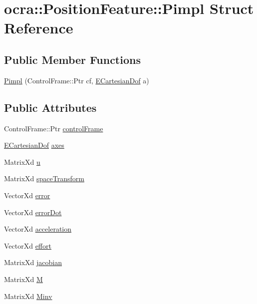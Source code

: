 \hypertarget{structocra_1_1PositionFeature_1_1Pimpl}{}\section{ocra\+:\+:Position\+Feature\+:\+:Pimpl Struct Reference}
\label{structocra_1_1PositionFeature_1_1Pimpl}
\subsection*{Public Member Functions}
\begin{DoxyCompactItemize}
\item 
\hyperlink{structocra_1_1PositionFeature_1_1Pimpl_ad886f374a5f070290519a8ccbaff9ab8}{Pimpl} (Control\+Frame\+::\+Ptr cf, \hyperlink{namespaceocra_a436781c7059a0f76027df1c652126260}{E\+Cartesian\+Dof} a)
\end{DoxyCompactItemize}
\subsection*{Public Attributes}
\begin{DoxyCompactItemize}
\item 
Control\+Frame\+::\+Ptr \hyperlink{structocra_1_1PositionFeature_1_1Pimpl_ad770aac1608c2e6ccf13ee84539313c5}{control\+Frame}
\item 
\hyperlink{namespaceocra_a436781c7059a0f76027df1c652126260}{E\+Cartesian\+Dof} \hyperlink{structocra_1_1PositionFeature_1_1Pimpl_a671e502b35c4d7ec8c8f972933ebac1e}{axes}
\item 
Matrix\+Xd \hyperlink{structocra_1_1PositionFeature_1_1Pimpl_a5299db1f5f86c7a5808fbf1738ee438a}{u}
\item 
Matrix\+Xd \hyperlink{structocra_1_1PositionFeature_1_1Pimpl_a2e80e58cc94be8c44f8fee3dd030192e}{space\+Transform}
\item 
Vector\+Xd \hyperlink{structocra_1_1PositionFeature_1_1Pimpl_ab0c14028446505c11d15d0dfce51b97a}{error}
\item 
Vector\+Xd \hyperlink{structocra_1_1PositionFeature_1_1Pimpl_a3bff7b8d61a5575a68503d6767478950}{error\+Dot}
\item 
Vector\+Xd \hyperlink{structocra_1_1PositionFeature_1_1Pimpl_a2a251a27da0e093461ba88a7dcb5ce1d}{acceleration}
\item 
Vector\+Xd \hyperlink{structocra_1_1PositionFeature_1_1Pimpl_a66425331a37215913daa3ca7de5bce57}{effort}
\item 
Matrix\+Xd \hyperlink{structocra_1_1PositionFeature_1_1Pimpl_a9cd18a0039e2ebbce05d78403667dd02}{jacobian}
\item 
Matrix\+Xd \hyperlink{structocra_1_1PositionFeature_1_1Pimpl_aa061dcd02d8f11de5edd55e8f2535bfe}{M}
\item 
Matrix\+Xd \hyperlink{structocra_1_1PositionFeature_1_1Pimpl_a7f6b8df16f7f9cbbe8e917e3ed4811eb}{Minv}
\end{DoxyCompactItemize}


